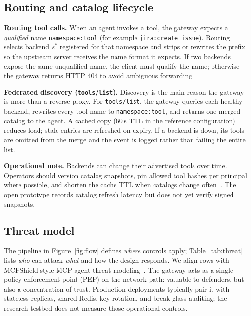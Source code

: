 \documentclass[11pt]{article}
\newcommand{\code}[1]{\texttt{#1}}
\newcommand{\mcpshield}{MCPShield}
\begin{document}
\subsection{Routing and catalog lifecycle}

\textbf{Routing tool calls.}
When an agent invokes a tool, the gateway expects a \emph{qualified} name \code{namespace:tool} (for example \code{jira:create\_issue}).
Routing selects backend $s^*$ registered for that namespace and strips or rewrites the prefix so the upstream server receives the name format it expects.
If two backends expose the same unqualified name, the client must qualify the name; otherwise the gateway returns HTTP 404 to avoid ambiguous forwarding.

\textbf{Federated discovery (\code{tools/list}).}
Discovery is the main reason the gateway is more than a reverse proxy.
For \code{tools/list}, the gateway queries each healthy backend, rewrites every tool name to \code{namespace:tool}, and returns one merged catalog to the agent.
A cached copy (60\,s TTL in the reference configuration) reduces load; stale entries are refreshed on expiry.
If a backend is down, its tools are omitted from the merge and the event is logged rather than failing the entire list.

\textbf{Operational note.}
Backends can change their advertised tools over time.
Operators should version catalog snapshots, pin allowed tool hashes per principal where possible, and shorten the cache TTL when catalogs change often~\cite{mcpshieldFormal2026}.
The open prototype records catalog refresh latency but does not yet verify signed snapshots.

\subsection{Threat model}
\label{sec:threat}

The pipeline in Figure~\ref{fig:flow} defines \emph{where} controls apply; Table~\ref{tab:threat} lists \emph{who} can attack \emph{what} and how the design responds.
We align rows with \mcpshield-style MCP agent threat modeling~\cite{mcpshieldFormal2026}.
The gateway acts as a single policy enforcement point (PEP) on the network path: valuable to defenders, but also a concentration of trust.
Production deployments typically pair it with stateless replicas, shared Redis, key rotation, and break-glass auditing; the research testbed does not measure those operational controls.
\end{document}
